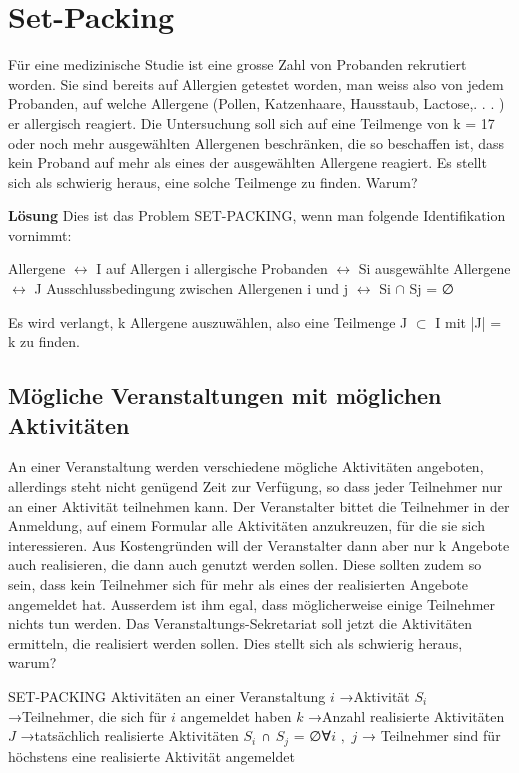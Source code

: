 \section{Set-Packing}
Für eine medizinische Studie ist eine grosse Zahl von Probanden rekrutiert worden. Sie sind bereits auf Allergien getestet worden, man weiss also von jedem Probanden, auf welche Allergene (Pollen, Katzenhaare, Hausstaub, Lactose,. . . ) er allergisch reagiert. Die Untersuchung soll sich auf eine Teilmenge von k = 17 oder noch mehr ausgewählten Allergenen beschränken, die so beschaffen ist, dass kein Proband auf mehr als eines der ausgewählten Allergene reagiert. Es stellt sich als schwierig heraus, eine solche Teilmenge zu finden. Warum?

\textbf{Lösung} Dies ist das Problem SET-PACKING, wenn man folgende Identifikation vornimmt:

Allergene $\leftrightarrow$ I
auf Allergen i allergische Probanden $\leftrightarrow$ Si 
ausgewählte Allergene $\leftrightarrow$ J
Ausschlussbedingung zwischen Allergenen i und j $\leftrightarrow$ Si $\cap$ Sj = ∅

Es wird verlangt, k Allergene auszuwählen, also eine Teilmenge J $\subset$ I mit |J| = k zu finden.

\subsection{Mögliche Veranstaltungen mit möglichen Aktivitäten}

An einer Veranstaltung werden verschiedene mögliche Aktivitäten angeboten, allerdings steht nicht genügend Zeit zur Verfügung, so dass jeder Teilnehmer nur an einer Aktivität teilnehmen kann. Der Veranstalter bittet die Teilnehmer in der Anmeldung, auf einem Formular alle Aktivitäten anzukreuzen, für die sie sich interessieren. Aus Kostengründen will der Veranstalter dann aber nur k Angebote auch realisieren, die dann auch genutzt werden sollen. Diese sollten zudem so sein, dass kein Teilnehmer sich für mehr als eines der realisierten Angebote angemeldet hat. Ausserdem ist ihm egal, dass möglicherweise einige Teilnehmer nichts tun
werden.
Das Veranstaltungs-Sekretariat soll jetzt die Aktivitäten ermitteln, die realisiert werden sollen.
Dies stellt sich als schwierig heraus, warum?

SET-PACKING Aktivitäten an einer Veranstaltung
$i$ →Aktivität
$S_i$ →Teilnehmer, die sich für $i$ angemeldet haben
$k$ →Anzahl realisierte Aktivitäten
$J$ →tatsächlich realisierte Aktivitäten
$S_i$ ∩ $S_j$ = ∅∀$i$ $,$ $j$ → Teilnehmer sind für höchstens eine realisierte Aktivität angemeldet